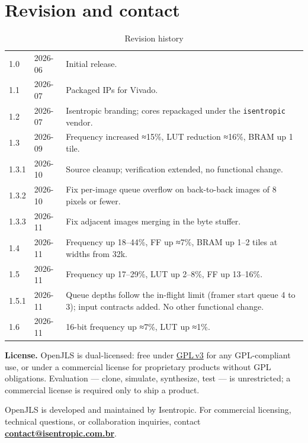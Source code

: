 \documentclass[10pt,a4paper]{article}
\newcommand{\hd}[1]{\leavevmode{\kickerfont\scriptsize\color{muted}\MakeUppercase{#1}}}
\newcommand{\about}{≈}
\begin{document}
\section{Revision and contact}
\begin{table}[H]
  \centering
  \caption{Revision history}
  \label{tab:revision}
\begin{tabular}{@{}l l l@{}}
  \toprule
  \hd{Version} & \hd{Date} & \hd{Notes} \\
  \midrule
  1.0 & 2026-06 & Initial release. \\
  1.1 & 2026-07 & Packaged IPs for Vivado. \\
  1.2 & 2026-07 & Isentropic branding; cores repackaged under the
  \texttt{isentropic} vendor. \\
  1.3 & 2026-09 & Frequency increased \about15\%, LUT reduction \about16\%,
  BRAM up 1 tile. \\
  1.3.1 & 2026-10 & Source cleanup; verification extended, no functional
  change. \\
  1.3.2 & 2026-10 & Fix per-image queue overflow on back-to-back images of
  8 pixels or fewer. \\
  1.3.3 & 2026-11 & Fix adjacent images merging in the byte stuffer. \\
  1.4 & 2026-11 & Frequency up 18--44\%, FF up \about7\%, BRAM up 1--2 tiles
  at widths from 32k. \\
  1.5 & 2026-11 & Frequency up 17--29\%, LUT up 2--8\%, FF up 13--16\%. \\
  1.5.1 & 2026-11 & Queue depths follow the in-flight limit (framer start
  queue 4 to 3); input contracts added. No other functional change. \\
  1.6 & 2026-11 & 16-bit frequency up \about7\%, LUT up \about1\%. \\
  \bottomrule
\end{tabular}
\end{table}

\noindent\textbf{License.} OpenJLS is dual-licensed: free under
\href{https://www.gnu.org/licenses/gpl-3.0.html}{GPL\,v3} for any GPL-compliant
use, or under a commercial license for proprietary products without GPL
obligations. Evaluation --- clone, simulate, synthesize, test --- is
unrestricted; a commercial license is required only to ship a product.

\noindent OpenJLS is developed and maintained by Isentropic. For commercial
licensing, technical questions, or collaboration inquiries, contact
\textbf{\href{mailto:contact@isentropic.com.br}{contact\allowbreak @\allowbreak isentropic.com.br}}.
\end{document}
